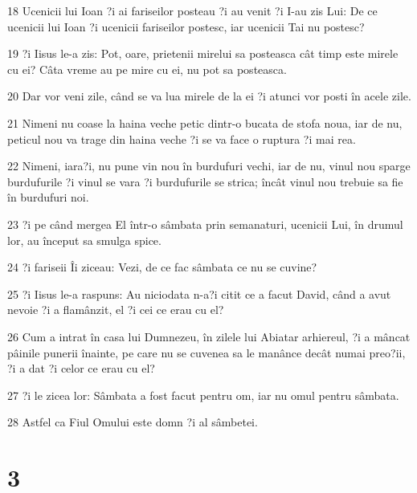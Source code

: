 \par 18 Ucenicii lui Ioan ?i ai fariseilor posteau ?i au venit ?i I-au zis Lui: De ce ucenicii lui Ioan ?i ucenicii fariseilor postesc, iar ucenicii Tai nu postesc?
\par 19 ?i Iisus le-a zis: Pot, oare, prietenii mirelui sa posteasca cât timp este mirele cu ei? Câta vreme au pe mire cu ei, nu pot sa posteasca.
\par 20 Dar vor veni zile, când se va lua mirele de la ei ?i atunci vor posti în acele zile.
\par 21 Nimeni nu coase la haina veche petic dintr-o bucata de stofa noua, iar de nu, peticul nou va trage din haina veche ?i se va face o ruptura ?i mai rea.
\par 22 Nimeni, iara?i, nu pune vin nou în burdufuri vechi, iar de nu, vinul nou sparge burdufurile ?i vinul se vara ?i burdufurile se strica; încât vinul nou trebuie sa fie în burdufuri noi.
\par 23 ?i pe când mergea El într-o sâmbata prin semanaturi, ucenicii Lui, în drumul lor, au început sa smulga spice.
\par 24 ?i fariseii Îi ziceau: Vezi, de ce fac sâmbata ce nu se cuvine?
\par 25 ?i Iisus le-a raspuns: Au niciodata n-a?i citit ce a facut David, când a avut nevoie ?i a flamânzit, el ?i cei ce erau cu el?
\par 26 Cum a intrat în casa lui Dumnezeu, în zilele lui Abiatar arhiereul, ?i a mâncat pâinile punerii înainte, pe care nu se cuvenea sa le manânce decât numai preo?ii, ?i a dat ?i celor ce erau cu el?
\par 27 ?i le zicea lor: Sâmbata a fost facut pentru om, iar nu omul pentru sâmbata.
\par 28 Astfel ca Fiul Omului este domn ?i al sâmbetei.

\chapter{3}

